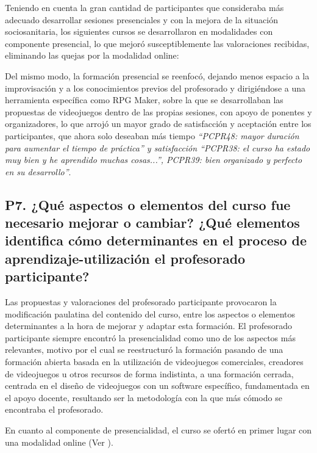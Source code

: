 \documentclass[spanish]{textolivre}
\begin{document}
Teniendo en cuenta la gran cantidad de participantes que consideraba más adecuado desarrollar sesiones presenciales y con la mejora de la situación sociosanitaria, los siguientes cursos se desarrollaron en modalidades con componente presencial, lo que mejoró susceptiblemente las valoraciones recibidas, eliminando las quejas por la modalidad online:

Del mismo modo, la formación presencial se reenfocó, dejando menos espacio a la improvisación y a los conocimientos previos del profesorado y dirigiéndose a una herramienta específica como RPG Maker, sobre la que se desarrollaban las propuestas de videojuegos dentro de las propias sesiones, con apoyo de ponentes y organizadores, lo que arrojó un mayor grado de satisfacción y aceptación entre los participantes, que ahora solo deseaban más tiempo \textit{“PCPR48: mayor duración para aumentar el tiempo de práctica” y satisfacción “PCPR38: el curso ha estado muy bien y he aprendido muchas cosas...”, PCPR39: bien organizado y perfecto en su desarrollo”}.


\subsection{P7. ¿Qué aspectos o elementos del curso fue necesario mejorar o cambiar? ¿Qué elementos identifica cómo determinantes en el proceso de aprendizaje-utilización el profesorado participante?}\label{sec-listas}
Las propuestas y valoraciones del profesorado participante provocaron la modificación paulatina del contenido del curso, entre los aspectos o elementos determinantes a la hora de mejorar y adaptar esta formación. El profesorado participante siempre encontró la presencialidad como uno de los aspectos más relevantes, motivo por el cual se reestructuró la formación pasando de una formación abierta basada en la utilización de videojuegos comerciales, creadores de videojuegos u otros recursos de forma indistinta, a una formación cerrada, centrada en el diseño de videojuegos con un software específico, fundamentada en el apoyo docente, resultando ser la metodología con la que más cómodo se encontraba el profesorado.

En cuanto al componente de presencialidad, el curso se ofertó en primer lugar con una modalidad online (Ver ).
\end{document}
